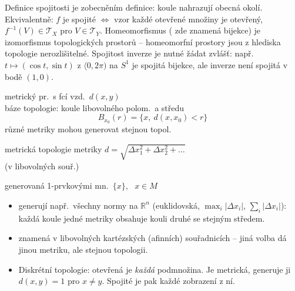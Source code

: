 \begin{vysvetleni}
Definice spojitosti je zobecněním \uv{$\varepsilon$--$\delta$} definice: koule nahrazují obecná okolí. Ekvivalentně: $f$ je spojité $\Leftrightarrow$ vzor každé otevřené množiny je otevřený, $f^{-1}(V)\in\mathcal{T}_X$ pro $V\in\mathcal{T}_Y$.
Homeomorfismus ( zde znamená bijekce) je izomorfismus topologických prostorů -- homeomorfní prostory jsou z hlediska topologie nerozlišitelné. Spojitost inverze je nutné žádat zvlášť: např.\ $t\mapsto(\cos t,\sin t)$ z $\langle 0,2\pi)$ na $S^1$ je spojitá bijekce, ale inverze není spojitá v bodě $(1,0)$.
\end{vysvetleni}

\begin{priklad}
metrický pr.\ s fcí vzd.\ $d(x,y)$ \\
báze topologie: koule libovolného polom.\ a středu
\[ B_{x_0}(r) = \{x,\ d(x,x_0) < r\} \]
různé metriky mohou generovat stejnou topol.
\end{priklad}

\begin{priklad}
metrická topologie metriky $d = \sqrt{\Delta x_1^2 + \Delta x_2^2 + \dots}$ \\
(v libovolných souř.)
\end{priklad}

\begin{priklad}
generovaná 1-prvkovými mn.\ $\{x\}$, \ $x\in M$
\end{priklad}

\begin{vysvetleni}[K příkladům]
\begin{itemize}[nosep]
  \item {} generují např.\ všechny normy na $\mathbb{R}^n$ (euklidovská, $\max_i|\Delta x_i|$, $\sum_i|\Delta x_i|$): každá koule jedné metriky obsahuje kouli druhé se stejným středem.
  \item {} znamená v libovolných kartézských (afinních) souřadnicích -- jiná volba dá jinou metriku, ale stejnou topologii.
  \item Diskrétní topologie: otevřená je \emph{každá} podmnožina. Je metrická, generuje ji $d(x,y)=1$ pro $x\neq y$. Spojité je pak každé zobrazení z ní.
\end{itemize}
\end{vysvetleni}

